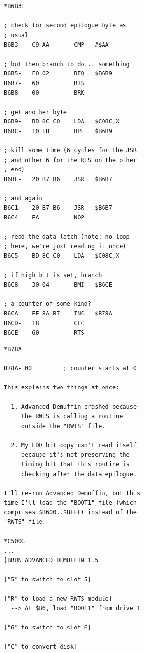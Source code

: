 \documentclass{article}
\begin{document}
\begin{verbatim}
*B6B3L

; check for second epilogue byte as
; usual
B6B3-   C9 AA       CMP   #$AA

; but then branch to do... something
B6B5-   F0 02       BEQ   $B6B9
B6B7-   60          RTS
B6B8-   00          BRK

; get another byte
B6B9-   BD 8C C0    LDA   $C08C,X
B6BC-   10 FB       BPL   $B6B9

; kill some time (6 cycles for the JSR
; and other 6 for the RTS on the other
; end)
B6BE-   20 B7 B6    JSR   $B6B7

; and again
B6C1-   20 B7 B6    JSR   $B6B7
B6C4-   EA          NOP

; read the data latch (note: no loop
; here, we're just reading it once)
B6C5-   BD 8C C0    LDA   $C08C,X

; if high bit is set, branch
B6C8-   30 04       BMI   $B6CE

; a counter of some kind?
B6CA-   EE 8A B7    INC   $B78A
B6CD-   18          CLC
B6CE-   60          RTS
\end{verbatim}

\newpage

\begin{verbatim}
*B78A

B78A- 00         ; counter starts at 0

This explains two things at once:

  1. Advanced Demuffin crashed because
     the RWTS is calling a routine
     outside the "RWTS" file.

  2. My EDD bit copy can't read itself
     because it's not preserving the
     timing bit that this routine is
     checking after the data epilogue.

I'll re-run Advanced Demuffin, but this
time I'll load the "BOOT1" file (which
comprises $B600..$BFFF) instead of the
"RWTS" file.

*C500G
...
]BRUN ADVANCED DEMUFFIN 1.5

["5" to switch to slot 5]

["R" to load a new RWTS module]
  --> At $B6, load "BOOT1" from drive 1

["6" to switch to slot 6]

["C" to convert disk]
\end{verbatim}

\newpage
\end{document}
